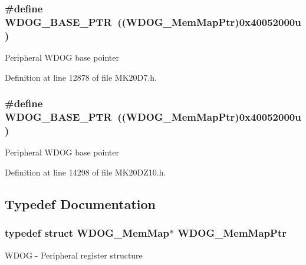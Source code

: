 \subsubsection[{\texorpdfstring{W\+D\+O\+G\+\_\+\+B\+A\+S\+E\+\_\+\+P\+TR}{WDOG_BASE_PTR}}]{\setlength{\rightskip}{0pt plus 5cm}\#define W\+D\+O\+G\+\_\+\+B\+A\+S\+E\+\_\+\+P\+TR~(({\bf W\+D\+O\+G\+\_\+\+Mem\+Map\+Ptr})0x40052000u)}\hypertarget{group___w_d_o_g___peripheral_ga72fb27c7bc1ae124f180d8f2c7b9fa79}{}\label{group___w_d_o_g___peripheral_ga72fb27c7bc1ae124f180d8f2c7b9fa79}
Peripheral W\+D\+OG base pointer 

Definition at line 12878 of file M\+K20\+D7.\+h.

\subsubsection[{\texorpdfstring{W\+D\+O\+G\+\_\+\+B\+A\+S\+E\+\_\+\+P\+TR}{WDOG_BASE_PTR}}]{\setlength{\rightskip}{0pt plus 5cm}\#define W\+D\+O\+G\+\_\+\+B\+A\+S\+E\+\_\+\+P\+TR~(({\bf W\+D\+O\+G\+\_\+\+Mem\+Map\+Ptr})0x40052000u)}\hypertarget{group___w_d_o_g___peripheral_ga72fb27c7bc1ae124f180d8f2c7b9fa79}{}\label{group___w_d_o_g___peripheral_ga72fb27c7bc1ae124f180d8f2c7b9fa79}
Peripheral W\+D\+OG base pointer 

Definition at line 14298 of file M\+K20\+D\+Z10.\+h.



\subsection{Typedef Documentation}
\subsubsection[{\texorpdfstring{W\+D\+O\+G\+\_\+\+Mem\+Map\+Ptr}{WDOG_MemMapPtr}}]{\setlength{\rightskip}{0pt plus 5cm}typedef struct {\bf W\+D\+O\+G\+\_\+\+Mem\+Map}$\ast$ {\bf W\+D\+O\+G\+\_\+\+Mem\+Map\+Ptr}}\hypertarget{group___w_d_o_g___peripheral_gaed99974fa14a19f21a8770728ff09af3}{}\label{group___w_d_o_g___peripheral_gaed99974fa14a19f21a8770728ff09af3}
W\+D\+OG -\/ Peripheral register structure 

